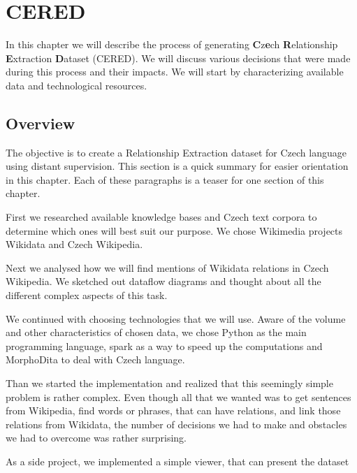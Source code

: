 \chapter{CERED}

In this chapter we will describe the process of generating \textbf{C}z\textbf{e}ch \textbf{R}elationship \textbf{E}xtraction \textbf{D}ataset (CERED). We will discuss various decisions that were made during this process and their impacts. 
We will start by characterizing available data and technological resources. 





\section{Overview}

The objective is to create a Relationship Extraction dataset for Czech language using distant supervision. This section is a quick summary for easier orientation in this chapter. Each of these paragraphs is a teaser for one section of this chapter.

First we researched available knowledge bases and Czech text corpora to determine which ones will best suit our purpose. We chose Wikimedia projects Wikidata and Czech Wikipedia. 

Next we analysed how we will find mentions of Wikidata relations in Czech Wikipedia. We sketched out dataflow diagrams and thought about all the different complex aspects of this task.

We continued with choosing technologies that we will use. Aware of the volume and other characteristics of chosen data, we chose Python as the main programming language, spark as a way to speed up the computations and MorphoDita to deal with Czech language. 

Than we started the implementation and realized that this seemingly simple problem is rather complex. Even though all that we wanted was to get sentences from Wikipedia, find words or phrases, that can have relations, and link those relations from Wikidata, the number of decisions we had to make and obstacles we had to overcome was rather surprising.

As a side project, we implemented a simple viewer, that can present the dataset




